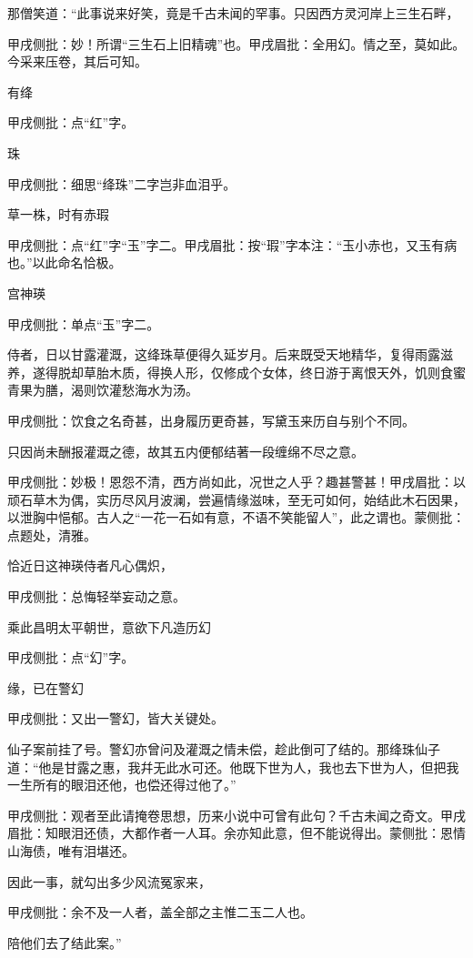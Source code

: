 \begin{parag}
    那僧笑道：“此事说来好笑，竟是千古未闻的罕事。只因西方灵河岸上三生石畔，\begin{note}甲戌侧批：妙！所谓“三生石上旧精魂”也。甲戌眉批：全用幻。情之至，莫如此。今采来压卷，其后可知。\end{note}有绛\begin{note}甲戌侧批：点“红”字。\end{note}珠\begin{note}甲戌侧批：细思“绛珠”二字岂非血泪乎。\end{note}草一株，时有赤瑕\begin{note}甲戌侧批：点“红”字“玉”字二。甲戌眉批：按“瑕”字本注：“玉小赤也，又玉有病也。”以此命名恰极。\end{note}宫神瑛\begin{note}甲戌侧批：单点“玉”字二。\end{note}侍者，日以甘露灌溉，这绛珠草便得久延岁月。后来既受天地精华，复得雨露滋养，遂得脱却草胎木质，得换人形，仅修成个女体，终日游于离恨天外，饥则食蜜青果为膳，渴则饮灌愁海水为汤。\begin{note}甲戌侧批：饮食之名奇甚，出身履历更奇甚，写黛玉来历自与别个不同。\end{note}只因尚未酬报灌溉之德，故其五内便郁结著一段缠绵不尽之意。\begin{note}甲戌侧批：妙极！恩怨不清，西方尚如此，况世之人乎？趣甚警甚！甲戌眉批：以顽石草木为偶，实历尽风月波澜，尝遍情缘滋味，至无可如何，始结此木石因果，以泄胸中悒郁。古人之“一花一石如有意，不语不笑能留人”，此之谓也。蒙侧批：点题处，清雅。\end{note}恰近日这神瑛侍者凡心偶炽，\begin{note}甲戌侧批：总悔轻举妄动之意。\end{note}乘此昌明太平朝世，意欲下凡造历幻\begin{note}甲戌侧批：点“幻”字。\end{note}缘，已在警幻\begin{note}甲戌侧批：又出一警幻，皆大关键处。\end{note}仙子案前挂了号。警幻亦曾问及灌溉之情未偿，趁此倒可了结的。那绛珠仙子道：“他是甘露之惠，我幷无此水可还。他既下世为人，我也去下世为人，但把我一生所有的眼泪还他，也偿还得过他了。”\begin{note}甲戌侧批：观者至此请掩卷思想，历来小说中可曾有此句？千古未闻之奇文。甲戌眉批：知眼泪还债，大都作者一人耳。余亦知此意，但不能说得出。蒙侧批：恩情山海债，唯有泪堪还。\end{note}因此一事，就勾出多少风流冤家来，\begin{note}甲戌侧批：余不及一人者，盖全部之主惟二玉二人也。\end{note}陪他们去了结此案。”
\end{parag}


